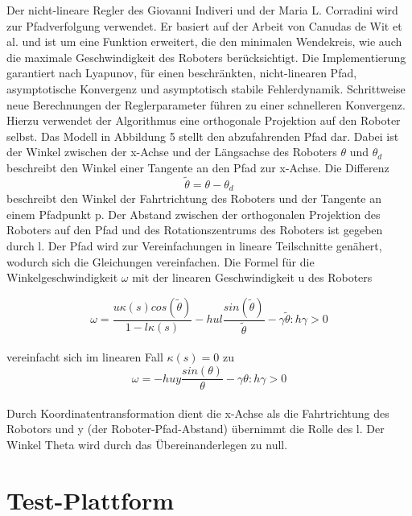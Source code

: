 \documentclass[11pt,a4paper]{article}
\begin{document}
{	Der nicht-lineare Regler des Giovanni Indiveri und der Maria L. Corradini\cite{Giovanni} wird zur Pfadverfolgung verwendet. Er basiert auf der Arbeit von Canudas de Wit et al. \cite{Canudas} und ist um eine Funktion erweitert, die den  minimalen Wendekreis, wie auch die maximale Geschwindigkeit des Roboters ber\"ucksichtigt. Die Implementierung garantiert nach Lyapunov, f\"ur einen beschr\"ankten, nicht-linearen Pfad, asymptotische Konvergenz und asymptotisch stabile Fehlerdynamik. Schrittweise neue Berechnungen der Reglerparameter f\"uhren zu einer schnelleren Konvergenz. Hierzu verwendet der Algorithmus eine orthogonale Projektion auf den Roboter selbst. Das Modell in Abbildung 5 stellt den abzufahrenden Pfad dar. Dabei ist der Winkel zwischen der x-Achse und der L\"angsachse des Roboters $\theta$ und $\theta_{d}$
beschreibt den Winkel einer Tangente an den Pfad zur 
x-Achse. Die Differenz 
\begin{equation}
\tilde{\theta} = \theta -\theta_{d}
\end{equation}
beschreibt den Winkel der Fahrtrichtung des Roboters und der Tangente an einem Pfadpunkt p. Der Abstand zwischen der orthogonalen Projektion des Roboters auf den Pfad und des Rotationszentrums des Roboters ist gegeben durch l.
Der Pfad wird zur Vereinfachungen in lineare Teilschnitte gen\"ahert, wodurch sich die Gleichungen vereinfachen. Die Formel f\"ur die Winkelgeschwindigkeit $\omega$ mit der linearen Geschwindigkeit u des Roboters


\begin{equation}
\omega=  \frac{u \kappa(s) cos(\tilde{\theta})}{1-l \kappa(s)}-h u l  \frac{sin(\tilde{\theta})}{\tilde{\theta}}-\gamma\tilde{\theta} :h\gamma > 0
\end{equation}\\

vereinfacht sich im linearen Fall $\kappa(s)=0$ zu \\

\begin{equation}
\omega= -h u y  \frac{sin(\theta)}{\theta}-\gamma\theta :h\gamma > 0
\end{equation}\\



	Durch Koordinatentransformation dient die x-Achse als die Fahrtrichtung des Robotors  und y (der Roboter-Pfad-Abstand) \"ubernimmt die Rolle des l. Der Winkel Theta wird durch das \"Ubereinanderlegen zu null.


\section{Test-Plattform}
}
\end{document}
